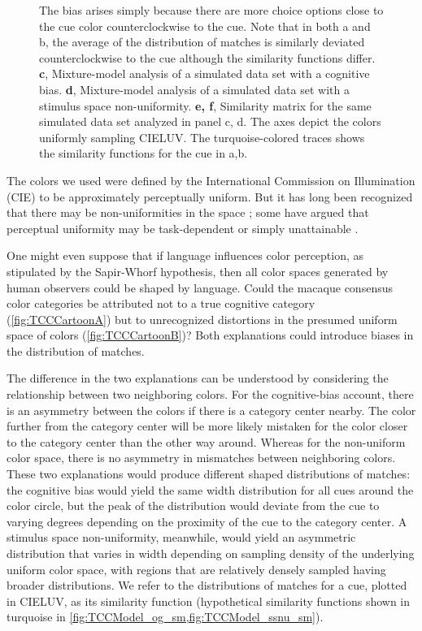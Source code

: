 \begin{figure}
\begin{fullwidth}
{	The bias arises simply because there are more choice options close to the cue color counterclockwise to the cue. 
	Note that in both a and b, the average of the distribution of matches is similarly deviated counterclockwise to the cue although the similarity functions differ. 
	\textbf{c}, Mixture-model analysis of a simulated data set with a cognitive bias. 
	\textbf{d}, Mixture-model analysis of a simulated data set with a stimulus space non-uniformity. 
	\textbf{e, f}, Similarity matrix for the same simulated data set analyzed in panel c, d. The axes depict the colors uniformly sampling CIELUV. The turquoise-colored traces shows the similarity functions for the cue in a,b.}
    \label{fig:TCCDemo}
    \end{fullwidth}
\end{figure}

The colors we used were defined by the International Commission on Illumination (CIE) to be approximately perceptually uniform. 
But it has long been recognized that there may be non-uniformities in the space \citep{stockman_colorimetry_2010}; some have argued that perceptual uniformity may be task-dependent or simply unattainable \citep{judd_ideal_1969}.

One might even suppose that if language influences color perception, as stipulated by the Sapir-Whorf hypothesis, then all color spaces generated by human observers could be shaped by language. 
Could the macaque consensus color categories be attributed not to a true cognitive category (\autoref{fig:TCCCartoonA}) but to unrecognized distortions in the presumed uniform space of colors (\autoref{fig:TCCCartoonB})?
Both explanations could introduce biases in the distribution of matches.

The difference in the two explanations can be understood by considering the relationship between two neighboring colors. 
For the cognitive-bias account, there is an asymmetry between the colors if there is a category center nearby.
The color further from the category center will be more likely mistaken for the color closer to the category center than the other way around. 
Whereas for the non-uniform color space, there is no asymmetry in mismatches between neighboring colors. 
These two explanations would produce different shaped distributions of matches: the cognitive bias would yield the same width distribution for all cues around the color circle, but the peak of the distribution would deviate from the cue to varying degrees depending on the proximity of the cue to the category center. 
A stimulus space non-uniformity, meanwhile, would yield an asymmetric distribution that varies in width depending on sampling density of the underlying uniform color space, with regions that are relatively densely sampled having broader distributions. 
We refer to the distributions of matches for a cue, plotted in CIELUV, as its similarity function (hypothetical similarity functions shown in turquoise in \autoref{fig:TCCModel_og_sm,fig:TCCModel_ssnu_sm}).

